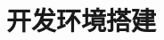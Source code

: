 \renewenvironment{longtable}{\rowcolors{2}{LightGray}{white}\oldlongtable} {\endoldlongtable}
\chapter{开发环境搭建}












